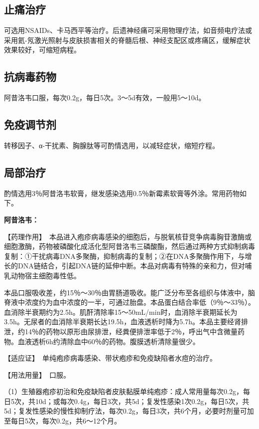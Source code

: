 \subsection{止痛治疗}

可选用NSAIDs、卡马西平等治疗。后遗神经痛可采用物理疗法，如音频电疗法或采用氦-氖激光照射与皮肤损害相关的脊髓后根、神经支配区或疼痛区，缓解症状效果较好，可缩短病程。

\subsection{抗病毒药物}

阿昔洛韦口服，每次0.2g，每日5次。3～5d有效，一般用5～10d。

\subsection{免疫调节剂}

转移因子、α-干扰素、胸腺肽等可酌情选用，以减轻症状，缩短疗程。

\subsection{局部治疗}

酌情选用3％阿昔洛韦软膏，继发感染选用0.5％新霉素软膏等外涂。常用药物如下。

\textbf{阿昔洛韦：}

【药理作用】　本品进入疱疹病毒感染的细胞后，与脱氧核苷竞争病毒胸苷激酶或细胞激酶，药物被磷酸化成活化型阿昔洛韦三磷酸酯，然后通过两种方式抑制病毒复制：①干扰病毒DNA多聚酶，抑制病毒的复制；②在DNA多聚酶作用下，与增长的DNA链结合，引起DNA链的延伸中断。本品对病毒有特殊的亲和力，但对哺乳动物宿主细胞毒性低。

本品口服吸收差，约15％～30％由胃肠道吸收。能广泛分布至各组织与体液中，脑脊液中浓度约为血中浓度的一半，可通过胎盘。本品蛋白结合率低（9％～33％）。血消除半衰期约为2.5h。肌酐清除率15～50mL/min时，血消除半衰期延长为3.5h。无尿者的血消除半衰期长达19.5h，血液透析时降为5.7h。本品主要经肾排泄，约14％的药物以原形由尿排泄，经粪便排泄率低于2％，呼出气中含微量药物。血液透析6h约清除血中60％的药物。腹膜透析清除量很少。

【适应证】　单纯疱疹病毒感染、带状疱疹和免疫缺陷者水痘的治疗。

【用法用量】　口服。

（1）生殖器疱疹初治和免疫缺陷者皮肤黏膜单纯疱疹：成人常用量每次0.2g，每日5次，共10d；或每次0.4g，每日3次，共5d；复发性感染1次0.2g，每日5次，共5d；复发性感染的慢性抑制疗法，每次0.2g，每日3次，共6个月，必要时剂量可加至每日5次，每次0.2g，共6～12个月。

